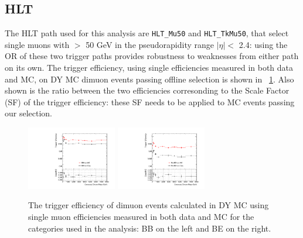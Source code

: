 \subsection{HLT}
The HLT path used for this analysis are \texttt{HLT\_Mu50} and \texttt{HLT\_TkMu50}, that select single muons with \pt $>$ 50 GeV in the pseudorapidity range $|\eta|<$ 2.4: using the OR of these two trigger paths provides robustness to weaknesses from either path on its own.
The trigger efficiency, using single efficiencies measured in both data and MC, on DY MC dimuon events passing offline selection is shown in \figurename~\ref{TrgEff}. Also shown is the ratio between the two efficiencies corresonding to the Scale Factor (SF) of the trigger efficiency: these SF needs to be applied to MC events passing our selection.
\begin{figure}[htbp]
\centering
\includegraphics[width=0.35\textwidth]{Images/Cap5/trigDimuonEffBB.pdf}
\includegraphics[width=0.35\textwidth]{Images/Cap5/trigDimuonEffNonBB.pdf}
\caption{The trigger efficiency of dimuon events calculated in DY MC using single muon efficiencies measured in both data and MC for the categories used in the analysis: BB on the left and BE on the right.}
\label{TrgEff}
\end{figure}

